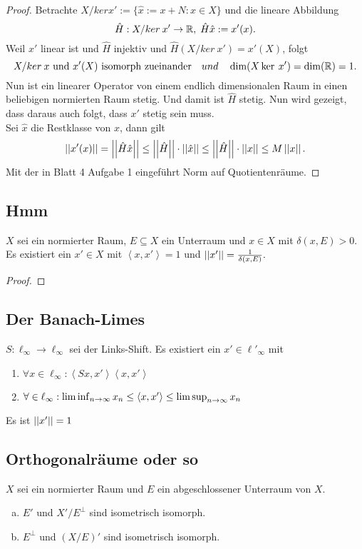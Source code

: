 \documentclass[FunkAnaSkriptSS2017.tex]{subfiles} %
\begin{document}
	\begin{proof}
		Betrachte $ X/ker x':= \{ \hat{x} := x + N: x\in X\} $ und die lineare Abbildung
			$$ \hat{H} : X/ker \:x' \to \mathbb{R}, \; \hat{H}\hat{x} := x'(x).$$
		Weil $x'$ linear ist und $\hat{H}$ injektiv und $\hat{H}(X/ker\: x') = x'(X)$, folgt
			$$X/ker\:x \text{ und } x'(X) \text{ isomorph zueinander} \quad und \quad \dim(X\ker \:x') = \dim(\mathbb{R}) = 1.$$ 
	Nun ist ein linearer Operator von einem endlich dimensionalen Raum in einen beliebigen normierten Raum stetig. Und damit ist $\hat{H}$ stetig. Nun wird gezeigt, dass daraus auch folgt, dass $x'$ stetig sein muss.\\
	Sei $\hat{x}$ die Restklasse von $x$, dann gilt 
		$$\left\lvert \left\lvert x'(x) \right\rvert \right\rvert = \left\lvert \left\lvert \hat{H}\hat{x} \right\rvert \right\rvert \leq \left\lvert \left\lvert \hat{H} \right\rvert \right\rvert \cdot \left\lvert \left\lvert \hat{x} \right\rvert \right\rvert \leq \left\lvert \left\lvert \hat{H} \right\rvert \right\rvert \cdot \left\lvert \left\lvert {x} \right\rvert \right\rvert \leq M \left\lvert \left\lvert x \right\rvert \right\rvert. $$ 
	Mit der in Blatt 4 Aufgabe 1 eingeführt Norm auf Quotientenräume.	
	\end{proof}
	

\subsection{ Hmm}
	$X$ sei ein normierter Raum, $E\subseteq X$ ein Unterraum und $x\in X$ mit $\delta(x,E) > 0$. \\
	Es existiert ein $x'\in X$ mit $\left \langle x,x' \right \rangle = 1$ und $\left\lvert \left\lvert  x'  \right\rvert \right\rvert = \frac{1}{\delta(x,E)}.$
	
	\begin{proof}
	
	\end{proof}

\subsection{ Der Banach-Limes}
	$S: \ell_\infty \to \ell_\infty$ sei der Links-Shift. Es existiert ein $x' \in \ell'_\infty$ mit
	\begin{enumerate}
		\item $\forall x \in \ell_\infty : \left \langle Sx, x' \right  \rangle \left \langle x,x' \right \rangle$
		\item $\forall \in \ell_\infty : \liminf_{n \to \infty} x_n \leq \left \langle x,x' \right \rangle \leq \limsup_{n\to\infty} x_n$
	\end{enumerate}
	Es ist $\left\lvert \left\lvert x' \right\rvert \right\rvert = 1$
	
	
\subsection{ Orthogonalräume oder so}
	$X$ sei ein normierter Raum und $E$ ein abgeschlossener Unterraum von $X$.
	\begin{enumerate}[(a)]
		\item $E'$ und $X'/E^\perp$ sind isometrisch isomorph.
		\item $E^\perp$ und $(X/E)'$ sind isometrisch isomorph.
	\end{enumerate}
	
\end{document}
